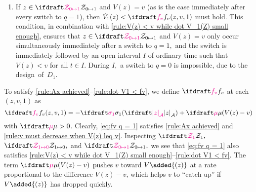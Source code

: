 {\begin{enumerate}
    \item 
    If $z\in \calZswitchtoone$ and $V(z) = v$ 
    (as is the case immediately after every switch to $q=1$),
    then $\dot V_1(z) < \fv(z, v, 1) $ must hold. 
    This condition, in combination with 
    \ref{rule:V(z) < v while dot V_1(Z) small enough}, 
    ensures that ${z\in \calZswitchtoone}$ and ${V(z) = v}$ 
    only occur simultaneously immediately after a switch to $q = 1,$
    and the switch is immediately followed by an open interval $I$ 
    of ordinary time such that $V(z) < v$ for all $t\in I.$ 
    During $I,$ a switch to $q = 0$ is impossible, due to the design~of~$D_1.$%
    \label{rule:dot V1 < fv}
\end{enumerate}%
}%
To satisfy \ref{rule:Ax achieved}--\ref{rule:dot V1 < fv}, %
we define $\fv$ at each $(z, v, 1)$ as
\begin{equation}
    \fv(z, v, 1) = -\sigmaone(\distA{z}) + \vdiffcoeff(V(z) - v)
    \label{eq:fv q = 1}
\end{equation}
with $\vdiffcoeff > 0$.
Clearly, \cref{eq:fv q = 1} satisfies 
\ref{rule:Ax achieved} and \ref{rule:v must decrease when V(z) leq v}.
Inspecting $\calZholdone,$ $\calZswitchtozero,$ 
and $\calZswitchtoone,$ we see that
\cref{eq:fv q = 1} also satisfies 
\ref{rule:V(z) < v while dot V_1(Z) small enough}--\ref{rule:dot V1 < fv}. %
The term $\vdiffcoeff(V(z) - v)$ pushes $v$ toward $V\added{(z)}$ 
at a rate proportional to the difference $V(z) - v$, 
which helps $v$ to ``catch up'' if $V\added{(z)}$ has dropped quickly.

